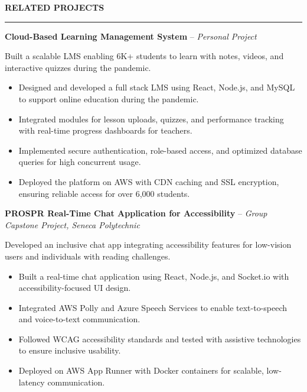 \documentclass[10pt,letterpaper]{article}
\begin{document}
\vspace{6pt}

\textbf{RELATED PROJECTS}\\[-8pt]
\noindent\rule{\textwidth}{1pt}

\vspace{-2pt}

\textbf{Cloud-Based Learning Management System} -- \emph{Personal Project}

\vspace{-1pt}

Built a scalable LMS enabling 6K+ students to learn with notes, videos, and interactive quizzes during the pandemic.
\vspace{-1pt}
\begin{itemize}
\item Designed and developed a full stack LMS using React, Node.js, and MySQL to support online education during the pandemic.
\item Integrated modules for lesson uploads, quizzes, and performance tracking with real-time progress dashboards for teachers.
\item Implemented secure authentication, role-based access, and optimized database queries for high concurrent usage.
\item Deployed the platform on AWS with CDN caching and SSL encryption, ensuring reliable access for over 6,000 students.
\end{itemize}

\textbf{PROSPR  Real-Time Chat Application for Accessibility} -- \emph{Group Capstone Project, Seneca Polytechnic}

\vspace{-1pt}

Developed an inclusive chat app integrating accessibility features for low-vision users and individuals with reading challenges.
\vspace{-1pt}
\begin{itemize}
\item Built a real-time chat application using React, Node.js, and Socket.io with accessibility-focused UI design.
\item Integrated AWS Polly and Azure Speech Services to enable text-to-speech and voice-to-text communication.
\item Followed WCAG accessibility standards and tested with assistive technologies to ensure inclusive usability.
\item Deployed on AWS App Runner with Docker containers for scalable, low-latency communication.
\end{itemize}
\end{document}
